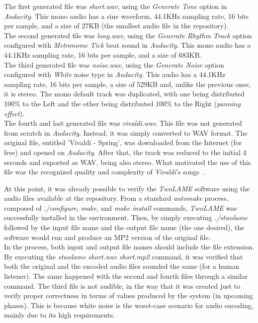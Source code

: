 The first generated file was \textit{short.wav}, using the \textit{Generate Tone} option in \textit{Audacity}. This mono audio has a sine waveform, 44.1KHz sampling rate, 16 bits per sample, and a size of 27KB (the smallest audio file in the repository).\\
The second generated file was \textit{long.wav}, using the \textit{Generate Rhythm Track} option configured with \textit{Metronome Tick} beat sound in \textit{Audacity}. This mono audio has a 44.1KHz sampling rate, 16 bits per sample, and a size of 683KB.\\
The third generated file was \textit{noise.wav}, using the \textit{Generate Noise} option configured with \textit{White} noise type in \textit{Audacity}. This audio has a 44.1KHz sampling rate, 16 bits per sample, a size of 529KB and, unlike the previous ones, it is stereo. The mono default track was duplicated, with one being distributed 100\% to the Left and the other being distributed 100\% to the Right (\textit{panning effect}).\\
The fourth and last generated file was \textit{vivaldi.wav}. This file was not generated from scratch in \textit{Audacity}. Instead, it was simply converted to WAV format. The original file, entitled 'Vivaldi - Spring', was downloaded from the Internet (for free) and opened on \textit{Audacity}. After that, the track was reduced to the initial 4 seconds and exported as WAV, being also stereo. What motivated the use of this file was the recognized quality and complexity of \textit{Vivaldi}'s songs~\cite{vivaldi}.

At this point, it was already possible to verify the \textit{TwoLAME} software using the audio files available at the repository. From a standard \textit{automake} process, composed of \textit{./configure}, \textit{make}, and \textit{make install} commands, \textit{TwoLAME} was successfully installed in the environment. Then, by simply executing \textit{./stwolame} followed by the input file name and the output file name (the one desired), the software would run and produce an MP2 version of the original file.\\
In the process, both input and output file names should include the file extension. By executing the \textit{stwolame short.wav short.mp2} command, it was verified that both the original and the encoded audio files sounded the same (for a human listener). The same happened with the second and fourth files through a similar command. 
The third file is not audible, in the way that it was created just to verify proper correctness in terms of values produced by the system (in upcoming phases). This is because white noise is the worst-case scenario for audio encoding, mainly due to its high requirements. 


